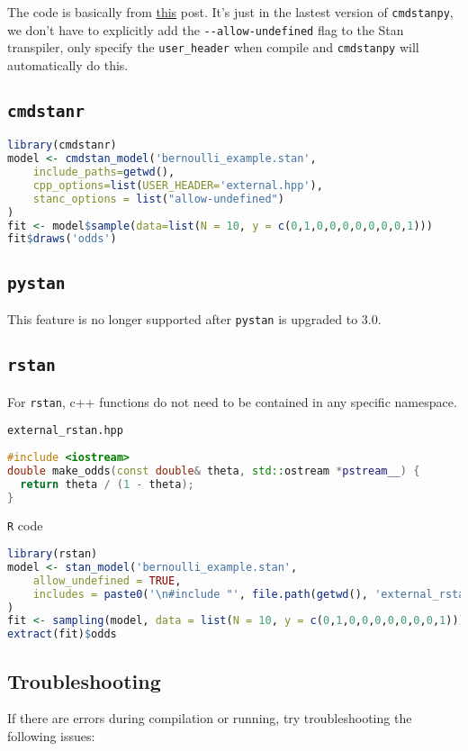 \documentclass[11pt]{article}
\begin{document}
The code is basically from \href{https://mc-stan.org/cmdstanpy/users-guide/examples/Using\%20External\%20C\%2B\%2B.html#}{this} post. It's just in the lastest version of \verb|cmdstanpy|, we don't have to explicitly add the \verb|--allow-undefined| flag to the Stan transpiler, only specify the \verb|user_header| when compile and \verb|cmdstanpy| will automatically do this.


\cprotect\subsection{\verb|cmdstanr|}
\begin{lstlisting}[language=r, style=lgeneral]
library(cmdstanr)
model <- cmdstan_model('bernoulli_example.stan',
    include_paths=getwd(),
    cpp_options=list(USER_HEADER='external.hpp'),
    stanc_options = list("allow-undefined")
)
fit <- model$sample(data=list(N = 10, y = c(0,1,0,0,0,0,0,0,0,1)))
fit$draws('odds')
\end{lstlisting}


\cprotect\subsection{\verb|pystan|}
This feature is no longer supported after \verb|pystan| is upgraded to 3.0.



\cprotect\subsection{\verb|rstan|}
For \verb|rstan|, c++ functions do not need to be contained in any specific namespace.

\verb|external_rstan.hpp|
\begin{lstlisting}[language=c++, style=lgeneral]
#include <iostream>
double make_odds(const double& theta, std::ostream *pstream__) {
  return theta / (1 - theta);
}
\end{lstlisting}

\verb|R| code
\begin{lstlisting}[language=r, style=lgeneral]
library(rstan)
model <- stan_model('bernoulli_example.stan',
    allow_undefined = TRUE,
    includes = paste0('\n#include "', file.path(getwd(), 'external_rstan.hpp'), '"\n'),
)
fit <- sampling(model, data = list(N = 10, y = c(0,1,0,0,0,0,0,0,0,1)))
extract(fit)$odds
\end{lstlisting}




\subsection{Troubleshooting}
If there are errors during compilation or running, try troubleshooting the following issues:
\end{document}
